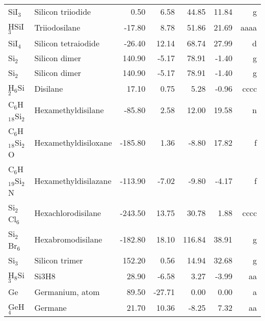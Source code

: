 \begin{table}
\begin{center}
\begin{tabular}{llrrrrr}
 SiI$_3$        & Silicon triiodide                      &     0.50    &     6.58  &    44.85  &    11.84  &      g\\
 HSiI$_3$       & Triiodosilane                          &   -17.80    &     8.78  &    51.86  &    21.69  &   aaaa\\
 SiI$_4$        & Silicon tetraiodide                    &   -26.40    &    12.14  &    68.74  &    27.99  &      d\\
 Si$_2$         & Silicon dimer                          &   140.90    &    -5.17  &    78.91  &    -1.40  &      g\\
 Si$_2$         & Silicon dimer                          &   140.90    &    -5.17  &    78.91  &    -1.40  &      g\\
 H$_6$Si$_2$       & Disilane                               &    17.10    &     0.75  &     5.28  &    -0.96  &   cccc\\
 C$_6$H$_1$$_8$Si$_2$    & Hexamethyldisilane                     &   -85.80    &     2.58  &    12.00  &    19.58  &      n\\
 C$_6$H$_1$$_8$Si$_2$O   & Hexamethyldisiloxane                   &  -185.80    &     1.36  &    -8.80  &    17.82  &      f\\
 C$_6$H$_1$$_9$Si$_2$N   & Hexamethyldisilazane                   &  -113.90    &    -7.02  &    -9.80  &    -4.17  &      f\\
 Si$_2$Cl$_6$      & Hexachlorodisilane                     &  -243.50    &    13.75  &    30.78  &     1.88  &   cccc\\
 Si$_2$Br$_6$      & Hexabromodisilane                      &  -182.80    &    18.10  &   116.84  &    38.91  &      g\\
 Si$_3$         & Silicon trimer                         &   152.20    &     0.56  &    14.94  &    32.68  &      g\\
 H$_8$Si$_3$       & Si3H8                                  &    28.90    &    -6.58  &     3.27  &    -3.99  &     aa\\
 Ge          & Germanium, atom                        &    89.50    &   -27.71  &     0.00  &     0.00  &      a\\
 GeH$_4$        & Germane                                &    21.70    &    10.36  &    -8.25  &     7.32  &     aa\\
\hline
\end{tabular}
\end{center}
\end{table}
\clearpage


